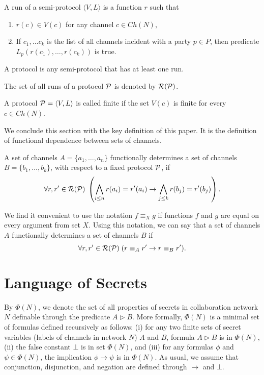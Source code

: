 \documentclass{llncs}
\newcommand{\rr}{{\cal R}}
\newcommand{\pp}{{\cal P}}
\begin{document}
\begin{definition}\label{}
A run of a semi-protocol $\langle V, L\rangle$ is a function $r$ such that 
\begin{enumerate}
\item $r(c)\in V(c)$ for any channel $c \in Ch(N)$, 
\item If $c_1,\dots c_k$ is the list of all channels incident with a party $p\in P$, then predicate $L_p(r(c_1),\dots,r(c_k))$ is true.
\end{enumerate}
\end{definition}

\begin{definition}\label{protocol}
A protocol is any semi-protocol that has at least one run.
\end{definition}
The set of all runs of a protocol $\pp$ is denoted by $\rr(\pp)$.

\begin{definition}\label{rank}
A protocol $\pp =\langle V, L\rangle$ is called finite if the set $V(c)$ is finite for every $c\in Ch(N)$. 
\end{definition}

We conclude this section with the key definition of this paper. It is the definition of functional
dependence between sets of channels. 

\begin{definition}\label{dependence}
A set of channels $A=\{a_1,\dots,a_n\}$ functionally determines a set of channels $B=\{b_1,\dots,b_k\}$, with respect to a fixed protocol $\pp$, if
$$
\forall r,r'\in \rr(\pp)\; \left(\bigwedge_{i\le n} r(a_i)=r'(a_i) \rightarrow \bigwedge_{j\le k} r(b_j)=r'(b_j)\right).
$$
\end{definition}

We find it convenient to use the notation $f\equiv_X g$ if functions $f$ and $g$ are equal on every argument from set $X$. 
Using this notation, we can say that a set of channels $A$ functionally determines a set of channels $B$ if 
$$\forall r,r'\in \rr(\pp)\;(r\equiv_A r' \rightarrow r\equiv_B r').$$



\section{Language of Secrets}

By $\Phi(N)$, we denote the set of all properties of secrets in collaboration network $N$ definable through the predicate $A\rhd B$.  More formally, $\Phi(N)$ is a minimal set of formulas defined recursively as follows: (i)  for any two finite sets of secret variables (labels of channels in network $N$) $A$ and $B$, formula $A\rhd B$ is in $\Phi(N)$, (ii) the false constant $\bot$ is in set $\Phi(N)$, and (iii) for any formulas $\phi$ and $\psi \in \Phi(N)$, the implication $\phi\rightarrow \psi$ is in $\Phi(N)$. As usual, we assume that conjunction, disjunction, and negation are defined through $\rightarrow$ and $\bot$. 
\end{document}
